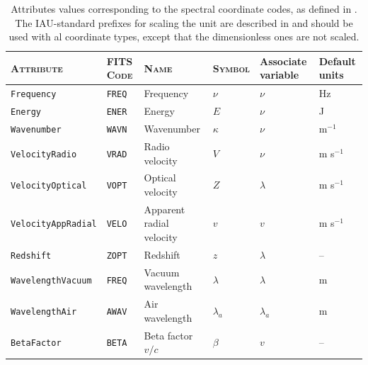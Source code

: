 \documentclass[a4paper,10pt,bibtotoc]{scrreprt}
\begin{document}
\begin{table}[htb]
  \centering
  \begin{tabular}{lp{1.5cm}llp{1.5cm}p{1.5cm}}
    \hline
    \textsc{Attribute} & \textsc{FITS Code} & \textsc{Name} &
    \textsc{Symbol} & Associate variable & Default units \\
    \hline \hline
    \verb|Frequency|       & \verb|FREQ| & Frequency  & $\nu$ & $\nu$ & Hz \\
    \verb|Energy|          & \verb|ENER| & Energy     & $E$   & $\nu$ & J  \\
    \verb|Wavenumber|      & \verb|WAVN| & Wavenumber & $\kappa$ & $\nu$ & m$^{-1}$ \\
    \verb|VelocityRadio|   & \verb|VRAD| & Radio velocity & $V$ & $\nu$ & m s$^{-1}$ \\
    \verb|VelocityOptical| & \verb|VOPT| & Optical velocity & $Z$ & $\lambda$ & m s$^{-1}$ \\
    \verb|VelocityAppRadial| & \verb|VELO| & Apparent radial velocity & $v$ & $v$ & m s$^{-1}$ \\
    \verb|Redshift|        & \verb|ZOPT| & Redshift    & $z$ & $\lambda$ & -- \\
    \verb|WavelengthVacuum|& \verb|FREQ| & Vacuum wavelength & $\lambda$ & $\lambda$ & m \\
    \verb|WavelengthAir|   & \verb|AWAV| & Air wavelength  & $\lambda_a$ & $\lambda_a$ & m \\
    \verb|BetaFactor|      & \verb|BETA| & Beta factor $v/c$  & $\beta$ & $v$ & -- \\
    \hline
  \end{tabular}
  \caption[Attributes values corresponding to the spectral coordinate
    codes]{Attributes values corresponding to the spectral coordinate
    codes, as defined in \cite{fits.paper3}. The IAU-standard prefixes
    for scaling the unit are described in \cite{fits.paper1} and
    should be used with al coordinate types, except that the
    dimensionless ones are not scaled.}
  \label{tab:spectral coordinate codes}
\end{table}
\end{document}
